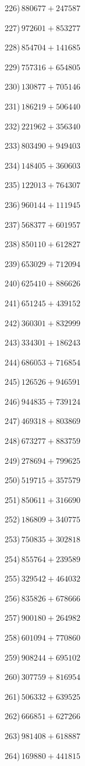 \documentclass{article}
\begin{document}
\begin{multicols}{2}
226)$\,880677+247587$ \par 
227)$\,972601+853277$ \par 
228)$\,854704+141685$ \par 
229)$\,757316+654805$ \par 
230)$\,130877+705146$ \par 
231)$\,186219+506440$ \par 
232)$\,221962+356340$ \par 
233)$\,803490+949403$ \par 
234)$\,148405+360603$ \par 
235)$\,122013+764307$ \par 
236)$\,960144+111945$ \par 
237)$\,568377+601957$ \par 
238)$\,850110+612827$ \par 
239)$\,653029+712094$ \par 
240)$\,625410+886626$ \par 
241)$\,651245+439152$ \par 
242)$\,360301+832999$ \par 
243)$\,334301+186243$ \par 
244)$\,686053+716854$ \par 
245)$\,126526+946591$ \par 
246)$\,944835+739124$ \par 
247)$\,469318+803869$ \par 
248)$\,673277+883759$ \par 
249)$\,278694+799625$ \par 
250)$\,519715+357579$ \par 
251)$\,850611+316690$ \par 
252)$\,186809+340775$ \par 
253)$\,750835+302818$ \par 
254)$\,855764+239589$ \par 
255)$\,329542+464032$ \par 
256)$\,835826+678666$ \par 
257)$\,900180+264982$ \par 
258)$\,601094+770860$ \par 
259)$\,908244+695102$ \par 
260)$\,307759+816954$ \par 
261)$\,506332+639525$ \par 
262)$\,666851+627266$ \par 
263)$\,981408+618887$ \par 
264)$\,169880+441815$ \par 

\end{multicols}
\end{document}
